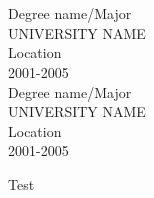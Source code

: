 \documentclass[12pt, a4paper, conference]{IEEEtran}
\begin{document}
\begin{minipage}[t][5cm][t]{0.3\textwidth}
{}\\
\\
Degree name/Major\\
UNIVERSITY NAME\\
Location\\
2001-2005
\\

Degree name/Major\\
UNIVERSITY NAME\\
Location\\
2001-2005

\end{minipage}
\quad
\vrule height 3ex width 1pt
\quad
	
\begin{minipage}[t][5cm][t]{0.3\textwidth}
\color{white}Test
\end{minipage}
\quad
\vrule height 4ex width 1pt
\quad

\noindent\makebox[\linewidth]{\rule{\paperwidth}{1pt}}
\end{document}
